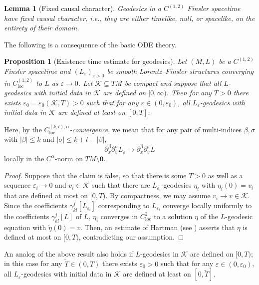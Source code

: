 \documentclass[a4paper,11pt]{article}
\numberwithin{equation}{section}
\theoremstyle{definition}
\theoremstyle{plain}
\newtheorem{Proposition}[Definition]{Proposition}
\newtheorem{Lemma}[Definition]{Lemma}
\newcommand{\eps}{\varepsilon}
\newcommand{\loc}{\mathrm{loc}}
\begin{document}
\begin{Lemma}[Fixed causal character]
Geodesics in a $C^{(1,2)}$ Finsler spacetime have fixed causal character, i.e., they are either timelike, null, or spacelike, on the entirety of their domain.
\end{Lemma}

The following is a consequence of the basic ODE theory.

\begin{Proposition}[Existence time estimate for geodesics]
\label{Prop: Existence time for Leps geodesics}
Let $(M,L)$ be a $C^{(1,2)}$ Finsler spacetime and $(L_\eps)_{\eps >0}$ be smooth Lorentz--Finsler structures converging in $C^{(1,2)}_{\loc}$ to $L$ as $\eps \to 0$.
Let $\mathcal K \subseteq TM$ be compact and suppose that all $L$-geodesics with initial data in $\mathcal{K}$ are defined on $[0,\infty)$.
Then for any $T>0$ there exists $\eps_0=\eps_0(\mathcal{K},T)>0$ such that for any $\eps \in (0,\eps_0)$, all $L_\eps$-geodesics with initial data in $\mathcal{K}$ are defined at least on $[0,T]$.
\end{Proposition}

Here, by the \emph{$C^{(k,l),\alpha}_{\loc}$-convergence}, we mean that for any pair of multi-indices $\beta,\sigma$ with $|\beta| \leq k$ and $|\sigma| \leq k +l -|\beta|$,
    \begin{equation}\label{eq:kla-conv}
        \partial_x^\beta \partial_v^\sigma L_\eps \to \partial_x^\beta \partial_v^\sigma L
    \end{equation}
locally in the $C^{\alpha}$-norm on $TM \setminus \mathbf 0$.


\begin{proof}
    Suppose that the claim is false, so that there is some $T>0$ as well as a sequence $\eps_i \to 0$ and $v_i \in \mathcal K$ such that there are $L_{\eps_i}$-geodesics $\eta_i$ with $\dot{\eta}_i(0) = v_i$ that are defined at most on $[0,T)$.
    By compactness, we may assume $v_i \to v \in \mathcal K$.
    Since the coefficients $\gamma^j_{kl}[L_{\eps_i}]$ corresponding to $L_{\eps_i}$ converge locally uniformly to the coefficients $\gamma^j_{kl}[L]$ of $L$, $\eta_i$ converges in $C^2_{\loc}$ to a solution $\eta$ of the $L$-geodesic equation with $\dot{\eta}(0) = v$.
    Then, an estimate of Hartman (see \cite[Prop.\ 2.5]{KOSS}) asserts that $\eta$ is defined at most on $[0,T)$, contradicting our assumption.
\end{proof}

An analog of the above result also holds if $L$-geodesics in $\mathcal{K}$ are defined on $[0,T)$; in this case for any $\widetilde{T} \in (0,T)$ there exists $\eps_0 >0$ such that for any $\eps \in (0,\eps_0)$, all $L_\eps$-geodesics with initial data in $\mathcal K$ are defined at least on $[0,\widetilde{T}]$.
\end{document}
